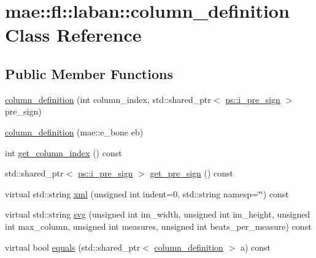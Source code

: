 \hypertarget{classmae_1_1fl_1_1laban_1_1column__definition}{\section{mae\-:\-:fl\-:\-:laban\-:\-:column\-\_\-definition Class Reference}
\label{classmae_1_1fl_1_1laban_1_1column__definition}
}
\subsection*{Public Member Functions}
\begin{DoxyCompactItemize}
\item 
\hyperlink{classmae_1_1fl_1_1laban_1_1column__definition_ac360b410ee99835940cc507ae2bbaf16}{column\-\_\-definition} (int column\-\_\-index, std\-::shared\-\_\-ptr$<$ \hyperlink{classmae_1_1fl_1_1laban_1_1ps_1_1i__pre__sign}{ps\-::i\-\_\-pre\-\_\-sign} $>$ pre\-\_\-sign)
\item 
\hyperlink{classmae_1_1fl_1_1laban_1_1column__definition_a71a931dfbf7c58e098df60269e3985e6}{column\-\_\-definition} (mae\-::e\-\_\-bone eb)
\item 
int \hyperlink{classmae_1_1fl_1_1laban_1_1column__definition_ac4a3d0ea4812adba6a950262bf51dd89}{get\-\_\-column\-\_\-index} () const 
\item 
std\-::shared\-\_\-ptr$<$ \hyperlink{classmae_1_1fl_1_1laban_1_1ps_1_1i__pre__sign}{ps\-::i\-\_\-pre\-\_\-sign} $>$ \hyperlink{classmae_1_1fl_1_1laban_1_1column__definition_abbfe8802f92c4a2d53a7eab415155470}{get\-\_\-pre\-\_\-sign} () const 
\item 
virtual std\-::string \hyperlink{classmae_1_1fl_1_1laban_1_1column__definition_ae159c9be24355b75fcf88c30fa00cf74}{xml} (unsigned int indent=0, std\-::string namesp=\char`\"{}\char`\"{}) const 
\item 
virtual std\-::string \hyperlink{classmae_1_1fl_1_1laban_1_1column__definition_add9bf764a8ca371345ded5f6c006288b}{svg} (unsigned int im\-\_\-width, unsigned int im\-\_\-height, unsigned int max\-\_\-column, unsigned int measures, unsigned int beats\-\_\-per\-\_\-measure) const 
\item 
virtual bool \hyperlink{classmae_1_1fl_1_1laban_1_1column__definition_a48af945f45b023bc78330d0acc8c95c0}{equals} (std\-::shared\-\_\-ptr$<$ \hyperlink{classmae_1_1fl_1_1laban_1_1column__definition}{column\-\_\-definition} $>$ a) const 
\end{DoxyCompactItemize}
